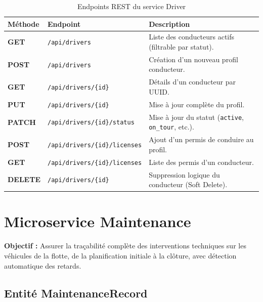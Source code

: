 \documentclass[12pt,a4paper]{article}
\begin{document}
\begin{table}[H]
\centering
\small
\begin{tabular}{|l|l|p{7.5cm}|}
  \hline
  \rowcolor{primary!15}
  \textbf{Méthode} & \textbf{Endpoint} & \textbf{Description} \\
  \hline
  \textbf{GET} & \texttt{/api/drivers} & Liste des conducteurs actifs (filtrable par statut). \\
  \hline
  \textbf{POST} & \texttt{/api/drivers} & Création d'un nouveau profil conducteur. \\
  \hline
  \textbf{GET} & \texttt{/api/drivers/\{id\}} & Détails d'un conducteur par UUID. \\
  \hline
  \textbf{PUT} & \texttt{/api/drivers/\{id\}} & Mise à jour complète du profil. \\
  \hline
  \textbf{PATCH} & \texttt{/api/drivers/\{id\}/status} & Mise à jour du statut (\texttt{active}, \texttt{on\_tour}, etc.). \\
  \hline
  \textbf{POST} & \texttt{/api/drivers/\{id\}/licenses} & Ajout d'un permis de conduire au profil. \\
  \hline
  \textbf{GET} & \texttt{/api/drivers/\{id\}/licenses} & Liste des permis d'un conducteur. \\
  \hline
  \textbf{DELETE} & \texttt{/api/drivers/\{id\}} & Suppression logique du conducteur (Soft Delete). \\
  \hline
\end{tabular}
\caption{Endpoints REST du service Driver}
\end{table}

\newpage

\section{Microservice Maintenance}

\begin{infobox}
\textbf{Objectif :} Assurer la traçabilité complète des interventions techniques sur les véhicules de la flotte, de la planification initiale à la clôture, avec détection automatique des retards.
\end{infobox}

\subsection{Entité MaintenanceRecord}
\end{document}
